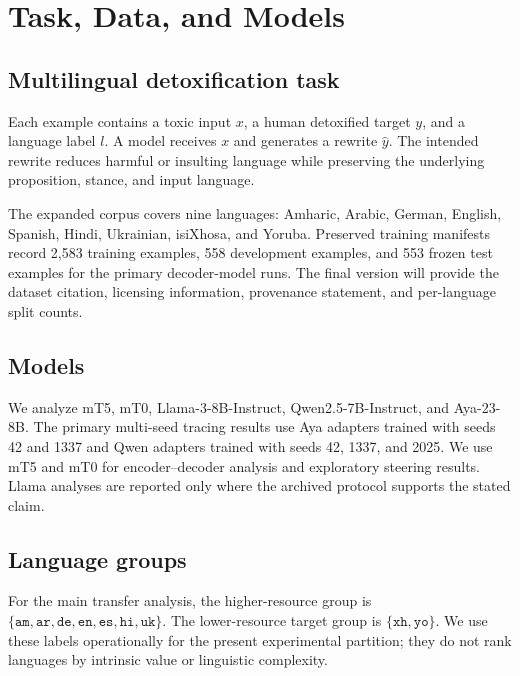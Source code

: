 \section{Task, Data, and Models}

\subsection{Multilingual detoxification task}

Each example contains a toxic input \(x\), a human detoxified target \(y\), and a
language label \(l\). A model receives \(x\) and generates a rewrite \(\hat{y}\).
The intended rewrite reduces harmful or insulting language while preserving the
underlying proposition, stance, and input language.

The expanded corpus covers nine languages: Amharic, Arabic, German, English, Spanish,
Hindi, Ukrainian, isiXhosa, and Yoruba. Preserved training manifests record 2,583
training examples, 558 development examples, and 553 frozen test examples for the
primary decoder-model runs. The final version will provide the dataset citation,
licensing information, provenance statement, and per-language split counts.

\subsection{Models}

We analyze mT5, mT0, Llama-3-8B-Instruct, Qwen2.5-7B-Instruct, and Aya-23-8B. The
primary multi-seed tracing results use Aya adapters trained with seeds 42 and 1337 and
Qwen adapters trained with seeds 42, 1337, and 2025. We use mT5 and mT0 for
encoder--decoder analysis and exploratory steering results. Llama analyses are
reported only where the archived protocol supports the stated claim.

\subsection{Language groups}

For the main transfer analysis, the higher-resource group is
\(\{\texttt{am}, \texttt{ar}, \texttt{de}, \texttt{en}, \texttt{es}, \texttt{hi},
\texttt{uk}\}\). The lower-resource target group is
\(\{\texttt{xh}, \texttt{yo}\}\). We use these labels operationally for the present
experimental partition; they do not rank languages by intrinsic value or linguistic
complexity.
